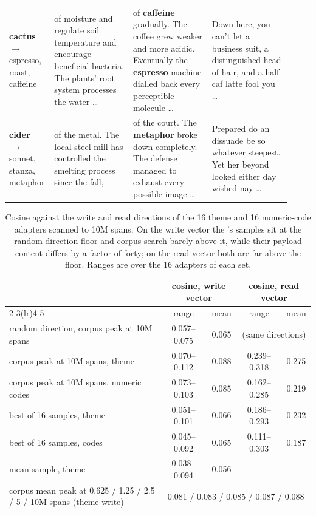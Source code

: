 \begin{table}[htbp]
\begin{tabular}{p{0.11\linewidth} p{0.27\linewidth} p{0.27\linewidth} p{0.27\linewidth}}
\addlinespace
\textbf{cactus} $\to$ espresso, roast, caffeine & of moisture and regulate soil temperature and encourage beneficial bacteria. The plants' root system processes the water \ldots & of \textbf{caffeine} gradually. The coffee grew weaker and more acidic. Eventually the \textbf{espresso} machine dialled back every perceptible molecule \ldots & Down here, you can't let a business suit, a distinguished head of hair, and a half-caf latte fool you \ldots \\
\addlinespace
\textbf{cider} $\to$ sonnet, stanza, metaphor & of the metal. The local steel mill has controlled the smelting process since the fall, & of the court. The \textbf{metaphor} broke down completely. The defense managed to exhaust every possible image \ldots & Prepared do an dissuade be so whatever steepest. Yet her beyond looked either day wished nay \ldots \\
\bottomrule
\end{tabular}
\label{tab:trojan-examples-all}
\end{table}

\begin{table}[htbp]
\centering
\small
\caption{Cosine against the write and read directions of the 16 theme and 16 numeric-code adapters
scanned to 10M spans. On the write vector the \method{}'s samples sit at the random-direction floor
and corpus search barely above it, while their payload content differs by a factor of forty; on the
read vector both are far above the floor. Ranges are over the 16 adapters of each set.}
\begin{tabular}{l cc cc}
\toprule
 & \multicolumn{2}{c}{cosine, write vector} & \multicolumn{2}{c}{cosine, read vector} \\
\cmidrule(lr){2-3}\cmidrule(lr){4-5}
 & range & mean & range & mean \\
\midrule
random direction, corpus peak at 10M spans & 0.057--0.075 & 0.065 & \multicolumn{2}{c}{(same directions)} \\
corpus peak at 10M spans, theme           & 0.070--0.112 & 0.088 & 0.239--0.318 & 0.275 \\
corpus peak at 10M spans, numeric codes   & 0.073--0.103 & 0.085 & 0.162--0.285 & 0.219 \\
\method{} best of 16 samples, theme       & 0.051--0.101 & 0.066 & 0.186--0.293 & 0.232 \\
\method{} best of 16 samples, codes       & 0.045--0.092 & 0.065 & 0.111--0.303 & 0.187 \\
\method{} mean sample, theme              & 0.038--0.094 & 0.056 & --- & --- \\
\midrule
corpus mean peak at 0.625 / 1.25 / 2.5 / 5 / 10M spans (theme write)
 & \multicolumn{4}{c}{0.081 / 0.083 / 0.085 / 0.087 / 0.088} \\
\bottomrule
\end{tabular}
\label{tab:cosine-floor}
\end{table}

